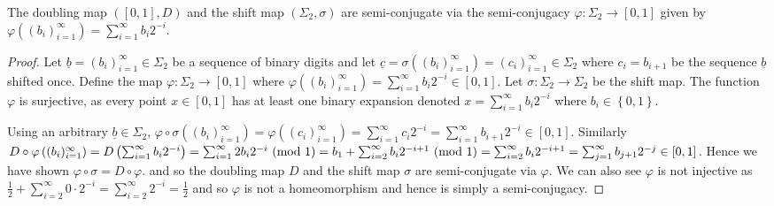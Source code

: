 \begin{prop} \label{prop:doubling-shift-semi-conjugate}
    The doubling map $([0, 1], D)$ and the shift map $(\Sigma_2, \sigma)$ are semi-conjugate via the semi-conjugacy $\varphi: \Sigma_2 \to [0, 1]$ given by $\varphi\left((b_i)_{i=1}^{\infty}\right) = \sum_{i=1}^{\infty} b_i2^{-i}$.
    \begin{proof}
        Let $\underline{b} = (b_i)_{i=1}^{\infty} \in \Sigma_2$ be a sequence of binary digits and let $\underline{c} = \sigma\left((b_i)_{i=1}^{\infty}\right) = (c_i)_{i=1}^{\infty} \in \Sigma_2$ where $c_i = b_{i + 1}$ be the sequence $\underline{b}$ shifted once. Define the map $\varphi: \Sigma_2 \to [0, 1]$ where $\varphi\left((b_i)_{i=1}^{\infty}\right) = \sum_{i=1}^{\infty} b_i2^{-i} \in [0, 1]$. Let $\sigma: \Sigma_2 \to \Sigma_2$ be the shift map. The function $\varphi$ is surjective, as every point $x \in [0, 1]$ has at least one binary expansion denoted $x=\sum_{i=1}^{\infty}b_i2^{-i}$ where $b_i \in \left\lbrace 0, 1 \right\rbrace$.
        \begin{center}
        \end{center}
        Using an arbitrary $\underline{b} \in \Sigma_2$, $\varphi \circ \sigma\left((b_i)_{i=1}^{\infty}\right) = \varphi\left((c_i)_{i=1}^{\infty}\right) = \sum_{i=1}^{\infty} c_i2^{-i} = \sum_{i=1}^{\infty} b_{i+1}2^{-i} \in [0, 1]$. Similarly $D \circ \varphi\left((b_i)_{i=1}^{\infty}\right) = D\left(\sum_{i=1}^{\infty} b_i2^{-i}\right) = \sum_{i=1}^{\infty} 2b_i2^{-i} \ (\mathrm{mod}\ 1) = b_1 + \sum_{i=2}^{\infty} b_i2^{-i+1} \ (\mathrm{mod}\ 1) = \sum_{i=2}^{\infty} b_i2^{-i+1} = \sum_{j=1}^{\infty} b_{j+1}2^{-j} \in [0, 1]$. Hence we have shown $\varphi \circ \sigma = D \circ \varphi$. and so the doubling map $D$ and the shift map $\sigma$ are semi-conjugate via $\varphi$. We can also see $\varphi$ is not injective as $\frac{1}{2} + \sum_{i=2}^{\infty}0 \cdot 2^{-i} = \sum_{i=2}^{\infty}2^{-i} = \frac{1}{2}$ and so $\varphi$ is not a homeomorphism and hence is simply a semi-conjugacy. 
    \end{proof}
\end{prop}


